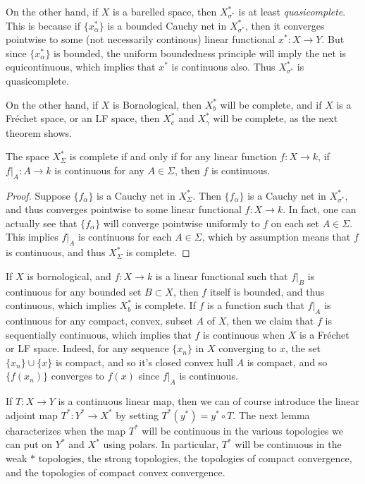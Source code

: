 On the other hand, if $X$ is a barelled space, then $X^*_{\sigma^*}$ is at least \emph{quasicomplete}. This is because if $\{ x_\alpha^* \}$ is a bounded Cauchy net in $X^*_{\sigma^*}$, then it converges pointwise to some (not necessarily continous) linear functional $x^*: X \to Y$. But since $\{ x_\alpha^* \}$ is bounded, the uniform boundedness principle will imply the net is equicontinuous, which implies that $x^*$ is continuous also. Thus $X^*_{\sigma^*}$ is quasicomplete.

On the other hand, if $X$ is Bornological, then $X^*_b$ will be complete, and if $X$ is a Fr\'{e}chet space, or an LF space, then $X^*_c$ and $X^*_\gamma$ will be complete, as the next theorem shows.

\begin{theorem}
    The space $X^*_\Sigma$ is complete if and only if for any linear function $f: X \to k$, if $f|_A: A \to k$ is continuous for any $A \in \Sigma$, then $f$ is continuous.
\end{theorem}
\begin{proof}
    Suppose $\{ f_\alpha \}$ is a Cauchy net in $X^*_\Sigma$. Then $\{ f_\alpha \}$ is a Cauchy net in $X^*_{\sigma^*}$, and thus converges pointwise to some linear functional $f: X \to k$. In fact, one can actually see that $\{ f_\alpha \}$ will converge pointwise uniformly to $f$ on each set $A \in \Sigma$. This implies $f|_A$ is continuous for each $A \in \Sigma$, which by assumption means that $f$ is continuous, and thus $X^*_\Sigma$ is complete.
\end{proof}

If $X$ is bornological, and $f: X \to k$ is a linear functional such that $f|_B$ is continuous for any bounded set $B \subset X$, then $f$ itself is bounded, and thus continuous, which implies $X^*_b$ is complete. If $f$ is a function such that $f|_A$ is continuous for any compact, convex, subset $A$ of $X$, then we claim that $f$ is sequentially continuous, which implies that $f$ is continuous when $X$ is a Fr\'{e}chet or LF space. Indeed, for any sequence $\{ x_n \}$ in $X$ converging to $x$, the set $\{ x_n \} \cup \{ x \}$ is compact, and so it's closed convex hull $A$ is compact, and so $\{ f(x_n) \}$ converges to $f(x)$ since $f|_A$ is continuous.

If $T: X \to Y$ is a continuous linear map, then we can of course introduce the linear adjoint map $T^*: Y^* \to X^*$ by setting $T^*(y^*) = y^* \circ T$. The next lemma characterizes when the map $T^*$ will be continuous in the various topologies we can put on $Y^*$ and $X^*$ using polars. In particular, $T^*$ will be continuous in the weak $*$ topologies, the strong topologies, the topologies of compact convergence, and the topologies of compact convex convergence.


